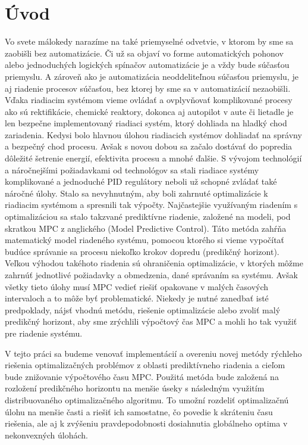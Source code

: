 \chapter{Úvod}
\label{ch:uvod}

Vo svete málokedy narazíme na také priemyselné odvetvie, v ktorom by sme sa zaobišli bez automatizácie. Či už sa objaví vo forme automatických pohonov alebo jednoduchých logických spínačov automatizácie je a vždy bude súčasťou priemyslu. A zároveň ako je automatizácia neoddeliteľnou súčasťou priemyslu, je aj riadenie procesov súčasťou, bez ktorej by sme sa v automatizácií nezaobišli. Vďaka riadiacim systémom vieme ovládať a ovplyvňovať komplikované procesy ako sú rektifikácie, chemické reaktory, dokonca aj autopilot v aute či lietadle je len bezpečne implementovaný riadiaci systém, ktorý dohliada na hladký chod zariadenia. Kedysi bolo hlavnou úlohou riadiacich systémov dohliadať na správny a bezpečný chod procesu. Avšak s novou dobou sa začalo dostávať do popredia dôležité šetrenie energií, efektivita procesu a mnohé ďalšie. S vývojom technológií a náročnejšími požiadavkami od technológov sa stali riadiace systémy komplikované a jednoduché PID regulátory neboli už schopné zvládať také náročné úlohy. Stalo sa nevyhnutným, aby boli zahrnuté optimalizácie k riadiacim systémom a spresnili tak výpočty. Najčastejšie využívaným riadením s optimalizáciou sa stalo takzvané prediktívne riadenie, založené na modeli, pod skratkou MPC z anglického (Model Predictive Control). Táto metóda zahŕňa matematický model riadeného systému, pomocou ktorého si vieme vypočítať budúce správanie sa procesu niekoľko krokov dopredu (predikčný horizont). Veľkou výhodou takéhoto riadenia sú ohraničenia optimalizácie, v ktorých môžme zahrnúť jednotlivé požiadavky a obmedzenia, dané správaním sa systému. Avšak všetky tieto úlohy musí MPC vedieť riešiť opakovane v malých časových intervaloch a to môže byť problematické. Niekedy je nutné zanedbať isté predpoklady, nájsť vhodnú metódu, riešenie optimalizácie alebo zvoliť malý predikčný horizont, aby sme zrýchlili výpočtový čas MPC a mohli ho tak využiť pre riadenie systému. 

V tejto práci sa budeme venovať implementácií a overeniu novej metódy rýchleho riešenia optimalizačných problémov z oblasti prediktívneho riadenia a cieľom bude znižovanie výpočtového času MPC. Použitá metóda bude založená na rozložení predikčného horizontu na menšie úseky s následným využitím distribuovaného optimalizačného algoritmu. To umožní rozdeliť optimalizačnú úlohu na menšie časti a riešiť ich samostatne, čo povedie k skráteniu času riešenia, ale aj k zvýšeniu pravdepodobnosti dosiahnutia globálneho optima v nekonvexných úlohách.

